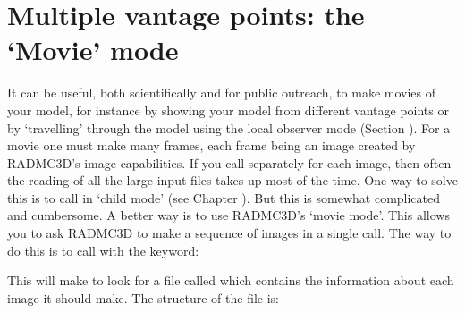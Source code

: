\documentclass[letterpaper,10pt,english]{sphinxmanual}
\begin{document}
\section{Multiple vantage points: the ‘Movie’ mode}
\label{\detokenize{imagesspectra:multiple-vantage-points-the-movie-mode}}\label{\detokenize{imagesspectra:sec-movie-mode}}
It can be useful, both scientifically and for public outreach, to make movies of
your model, for instance by showing your model from different vantage points or
by ‘travelling’ through the model using the local observer mode (Section
{\hyperref[\detokenize{imagesspectra:sec-local-observer}]{}}). For a movie one must make many frames, each frame
being an image created by RADMC\sphinxhyphen{}3D’s image capabilities. If you call 
separately for each image, then often the reading of all the large input files
takes up most of the time. One way to solve this is to call  in
‘child mode’ (see Chapter ). But this is somewhat
complicated and cumbersome. A better way is to use RADMC\sphinxhyphen{}3D’s ‘movie mode’. This
allows you to ask RADMC\sphinxhyphen{}3D to make a sequence of images in a single call. The
way to do this is to call  with the  keyword:

\begin{sphinxVerbatim}[commandchars=\\\{\}]
 
\end{sphinxVerbatim}

This will make  to look for a file called  which
contains the information about each image it should make. The structure of the
 file is:

\begin{sphinxVerbatim}[commandchars=\\\{\}]
   
   
   
   
\end{sphinxVerbatim}
\end{document}
